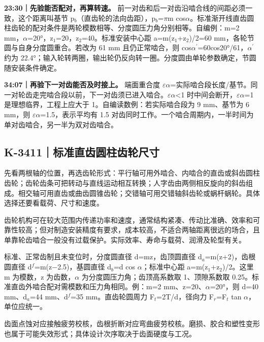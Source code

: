 \documentclass[zihao=5,a4paper,UTF8,fontset=fandol]{ctexart}
\begin{document}
\textbf{23:30｜先验能否配对，再算转速。} 前一对齿和后一对齿沿啮合线的间距必须一致，这个距离叫基节 p$_{b}$（直齿轮的法向齿距），p$_{b}$=$\pi$m cos$\alpha$。标准渐开线直齿圆柱齿轮的配对条件是两轮模数相等、分度圆压力角分别相等。自编例：m=2 mm，$\alpha$=20°，z$_{1}$=20，z$_{2}$=40。标准安装中心距 a=m(z$_{1}$+z$_{2}$)/2=60 mm，各轮节圆与自身分度圆重合。若改为 61 mm 且仍正常啮合，则 cos$\alpha$${}^{\prime}$=60cos20°/61，$\alpha$${}^{\prime}$约为 22.4°；输入轮转两圈，输出轮仍反向转一圈。分度圆由单轮参数确定，节圆随安装条件确定。


\textbf{34:07｜再验下一对齿能否及时接上。} 端面重合度 $\varepsilon$$\alpha$=实际啮合段长度/基节。同一对轮齿走完啮合段以前，下一对齿须已进入啮合。$\varepsilon$$\alpha$<1 时中间会断开，$\varepsilon$$\alpha$=1 是理想临界，工程上应大于 1。自编读数例：若实际啮合段为 9 mm、基节为 6 mm，则 $\varepsilon$$\alpha$=1.5，表示平均有 1.5 对齿同时工作。一个啮合周期内，一半时间为单对齿啮合，另一半为双对齿啮合。





\subsection{K-3411｜标准直齿圆柱齿轮尺寸}
\label{k-3411}

先看两根轴的位置，再选齿轮形式：平行轴可用外啮合、内啮合的直齿或斜齿圆柱齿轮；齿轮齿条可把转动与直线运动相互转换；人字齿由两侧相反旋向的斜齿组成。相交轴可用直齿或曲齿圆锥齿轮；交错轴可用交错轴斜齿轮或蜗杆蜗轮。具体选择还要看载荷、尺寸和速度。


齿轮机构可在较大范围内传递功率和速度，通常结构紧凑、传动比准确、效率和可靠性较高；但对制造安装精度有要求，成本较高，不适合两轴距离很远的场合，且单靠轮齿啮合一般没有过载保护。实际效率、寿命与载荷、润滑及轮型有关。


标准、正常齿制且未变位时，分度圆直径 d=mz，齿顶圆直径 d$_{a}$=m(z+2)，齿根圆直径 d$^{f}$=m(z$-$2.5)，基圆直径 d$_{b}$=d cos $\alpha$；标准中心距 a=m(z$_{1}$+z$_{2}$)/2。这里 m 为模数，z 为齿数，$\alpha$ 为分度圆压力角；齿顶高系数取 1、顶隙系数取 0.25。标准直齿外啮合配对需模数和压力角相同。例：m=2 mm、z=20、$\alpha$=20°，则 d=40 mm、d$_{a}$=44 mm、d$^{f}$=35 mm。直齿轮圆周力 F$_{t}$=2T/d，径向力 F$_{r}$=F$_{t}$ tan $\alpha$，单位应统一。


齿面点蚀对应接触疲劳校核，齿根折断对应弯曲疲劳校核。磨损、胶合和塑性变形也属于可能失效形式；具体设计次序取决于齿面硬度与工况。
\end{document}

